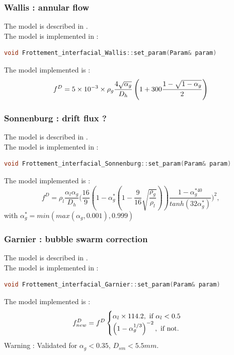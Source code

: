 \subsubsection{Wallis : annular flow}
The model is described in \cite{wallis}.\\
The model is implemented in :
\begin{lstlisting}[language=c++]
void Frottement_interfacial_Wallis::set_param(Param& param)
\end{lstlisting}
The model implemented is :
\begin{equation}
   f^{D}=\num{5e-3}\times{}\rho_g\frac{4\sqrt{\alpha_g}}{D_h}\left( 1+300\frac{1-\sqrt{1-\alpha_g}}{2} \right)
\end{equation}

\subsubsection{Sonnenburg : drift flux ?}
The model is described in .\\
The model is implemented in :
\begin{lstlisting}[language=c++]
void Frottement_interfacial_Sonnenburg::set_param(Param& param)
\end{lstlisting}
The model implemented is :
\begin{equation}
   f^{D}=\rho_l\frac{\alpha_l\alpha_g}{D_h}\Big(\frac{16}{9}(1-\alpha_g^*(1-\frac{9}{16}\sqrt{\frac{\rho_g}{\rho_l}}))\frac{1-\alpha_g^{*40}}{tanh(32\alpha_g^*)}\Big)^2,
\end{equation}
with $\alpha_g^*=min(max(\alpha_g,0.001),0.999)$

\subsubsection{Garnier : bubble swarm correction}
The model is described in \cite{GARNIER2002811}.\\
The model is implemented in :
\begin{lstlisting}[language=c++]
void Frottement_interfacial_Garnier::set_param(Param& param)
\end{lstlisting}
The model implemented is :
\begin{equation}
   f^{D}_{new}=f^{D}\begin{cases} \alpha_l\times 114.2,\text{ if }\alpha_l< 0.5  \\
          \left( 1-\alpha_g^{1/3} \right)^{-2},\text{ if not}.
   \end{cases}
\end{equation}
{\color{red} Warning} : Validated for $\alpha_g  < 0.35$, $D_{sm} < 5.5mm$.

